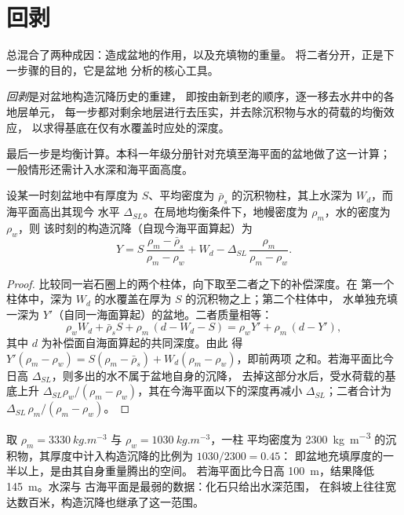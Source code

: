 \section{回剥}\label{sec:b2:basins-compared:backstripping}

总混合了两种成因：造成盆地的作用，以及充填物的重量。
将二者分开，正是下一步骤的目的，它是盆地
分析的核心工具。

\begin{definition}[回剥]\label{def:b2:basins-compared:backstripping}
\emph{回剥}是对盆地构造沉降历史的重建，
即按由新到老的顺序，逐一移去水井中的各地层单元，
每一步都对剩余地层进行去压实，并去除沉积物与水的荷载的均衡效应，
以求得基底在仅有水覆盖时应处的深度。
\end{definition}

最后一步是均衡计算。本科一年级分册针对充填至海平面的盆地做了这一计算；
一般情形还需计入水深和海平面高度。

\begin{proposition}[艾里回剥]\label{prop:b2:basins-compared:backstrip}
设某一时刻盆地中有厚度为 $S$、平均密度为
$\bar\rho_s$ 的沉积物柱，其上水深为 $W_d$，而海平面高出其现今
水平 $\Delta_{SL}$。在局地均衡条件下，地幔密度为 $\rho_m$，水的密度为 $\rho_w$，则
该时刻的构造沉降（自现今海平面算起）为
\[
  Y = S\,\frac{\rho_m - \bar\rho_s}{\rho_m - \rho_w} + W_d
      - \Delta_{SL}\,\frac{\rho_m}{\rho_m - \rho_w}.
\]
\end{proposition}

\begin{proof}
比较同一岩石圈上的两个柱体，向下取至二者之下的补偿深度。在
第一个柱体中，深为 $W_d$ 的水覆盖在厚为 $S$ 的沉积物之上；第二个柱体中，
水单独充填一深为 $Y'$（自同一海面算起）的盆地。二者质量相等：
\[
  \rho_w W_d + \bar\rho_s S + \rho_m\,(d - W_d - S) = \rho_w Y' + \rho_m\,(d - Y'),
\]
其中 $d$ 为补偿面自海面算起的共同深度。由此
得 $Y'(\rho_m - \rho_w) = S(\rho_m - \bar\rho_s) + W_d(\rho_m - \rho_w)$，即前两项
之和。若海平面比今日高 $\Delta_{SL}$，则多出的水不属于盆地自身的沉降，
去掉这部分水后，受水荷载的基底上升
$\Delta_{SL}\rho_w/(\rho_m - \rho_w)$，其在今海平面以下的深度再减小
$\Delta_{SL}$；二者合计为 $\Delta_{SL}\,\rho_m/(\rho_m - \rho_w)$。
\end{proof}

取 $\rho_m = \qty{3330}{kg.m^{-3}}$ 与 $\rho_w = \qty{1030}{kg.m^{-3}}$，一柱
平均密度为 \qty{2300}{kg.m^{-3}} 的沉积物，其厚度中计入构造沉降的比例为 $1030/2300 = 0.45$：
即盆地充填厚度的一半以上，是由其自身重量腾出的空间。
若海平面比今日高 \qty{100}{m}，结果降低 \qty{145}{m}。水深与
古海平面是最弱的数据：化石只给出水深范围，
在斜坡上往往宽达数百米，构造沉降也继承了这一范围。


